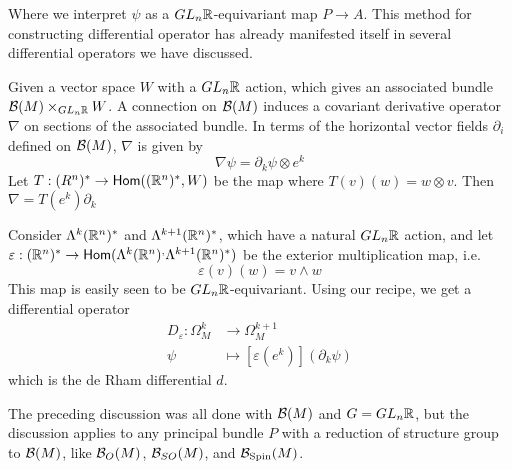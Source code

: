 Where we interpret $\psi$ as a $GL_n\mathbb{R}$-equivariant map $P \to A$.
%
This method for constructing differential operator has already manifested itself
in several differential operators we have discussed.
%
\begin{exmp}
Given a vector space $W$ with a $GL_n\mathbb{R}$ action, which gives an associated
bundle $\mathcal{B}(M) \times_{GL_n\mathbb{R}} W$. A connection on $\mathcal{B}(M)$ induces a
covariant derivative operator $\nabla$ on sections of the associated bundle.
In terms of the horizontal vector
fields $\partial_i$ defined on $\mathcal{B}(M)$, $\nabla$ is given by
\[
\nabla\psi = \partial_k\psi \otimes e^k
\]
Let $T : (R^n)^* \to \mathsf{Hom}((\mathbb{R}^n)^*, W)$ be the map where $T(v)(w) = w \otimes v$.
Then $\nabla = T(e^k)\partial_k$
\end{exmp}
%
\begin{exmp}
Consider $\Lambda^k(\mathbb{R}^n)^*$ and $\Lambda^{k+1}(\mathbb{R}^n)^*$, which have a natural
$GL_n\mathbb{R}$ action, and let
$\varepsilon : (\mathbb{R}^n)^* \to \mathsf{Hom}(\Lambda^k(\mathbb{R}^n)^,\Lambda^{k+1}(\mathbb{R}^n)^*)$
be the exterior multiplication map, i.e.
\[
\varepsilon(v)(w) = v \wedge w
\]
This map is easily seen to be $GL_n\mathbb{R}$-equivariant. Using our recipe, we get a
differential operator
\begin{align*}
D_\varepsilon : \Omega^k_M &\to \Omega^{k+1}_M \\
\psi &\mapsto [\varepsilon(e^k)](\partial_k\psi)
\end{align*}
which is the de Rham differential $d$.
\end{exmp}
%
The preceding discussion was all done with $\mathcal{B}(M)$ and $G = GL_n\mathbb{R}$, but the
discussion applies to any principal bundle $P$ with a reduction of structure
group to $\mathcal{B}(M)$, like $\mathcal{B}_O(M)$, $\mathcal{B}_{SO}(M)$, and $\mathcal{B}_{\mathrm{Spin}}(M)$. \\
%


